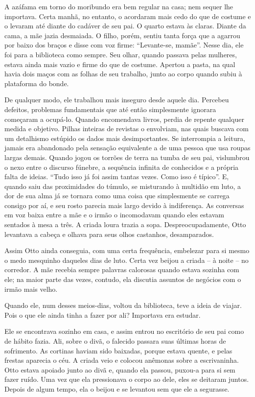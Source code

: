 A azáfama em torno do moribundo era bem regular na casa; nem sequer
lhe importava. Certa manhã, no entanto, o acordaram mais cedo do que de
costume e o levaram até diante do cadáver de seu pai. O quarto estava às
claras. Diante da cama, a mãe jazia desmaiada. O filho, porém, sentiu
tanta força que a agarrou por baixo dos braços e disse com voz firme:
``Levante-se, mamãe''. Nesse dia, ele foi para a biblioteca como sempre.
Seu olhar, quando passava pelas mulheres, estava ainda mais vazio e
firme do que de costume. Apertou a pasta, na qual havia dois maços com
as folhas de seu trabalho, junto ao corpo quando subiu à plataforma do
bonde.

De qualquer modo, ele trabalhou mais inseguro desde aquele dia. Percebeu
defeitos, problemas fundamentais que até então simplesmente ignorara
começaram a ocupá-lo. Quando encomendava livros, perdia de repente
qualquer medida e objetivo. Pilhas inteiras de revistas o envolviam, nas
quais buscava com um detalhismo estúpido os dados mais desimportantes.
Se interrompia a leitura, jamais era abandonado pela sensação
equivalente a de uma pessoa que usa roupas largas demais. Quando jogou
os torrões de terra na tumba de seu pai, vislumbrou o nexo entre o
discurso fúnebre, a sequência infinita de conhecidos e a própria falta
de ideias. ``Tudo isso já foi assim tantas vezes. Como isso é típico''.
E, quando saiu das proximidades do túmulo, se misturando à multidão em
luto, a dor de sua alma já se tornara como uma coisa que simplesmente se
carrega consigo por aí, e seu rosto parecia mais largo devido à
indiferença. As conversas em voz baixa entre a mãe e o irmão o
incomodavam quando eles estavam sentados à mesa a três. A criada loura
trazia a sopa. Despreocupadamente, Otto levantava a cabeça e olhava para
seus olhos castanhos, desamparados.

Assim Otto ainda conseguia, com uma certa frequência, embelezar para si
mesmo o medo mesquinho daqueles dias de luto. Certa vez beijou a criada
-- à noite -- no corredor. A mãe recebia sempre palavras calorosas
quando estava sozinha com ele; na maior parte das vezes, contudo, ela
discutia assuntos de negócios com o irmão mais velho.

Quando ele, num desses meios-dias, voltou da biblioteca, teve a ideia de
viajar. Pois o que ele ainda tinha a fazer por ali? Importava era
estudar.

Ele se encontrava sozinho em casa, e assim entrou no escritório de seu
pai como de hábito fazia. Ali, sobre o divã, o falecido passara suas
últimas horas de sofrimento. As cortinas haviam sido baixadas, porque
estava quente, e pelas frestas aparecia o céu. A criada veio e colocou
anêmonas sobre a escrivaninha. Otto estava apoiado junto ao divã e,
quando ela passou, puxou-a para si sem fazer ruído. Uma vez que ela
pressionava o corpo ao dele, eles se deitaram juntos. Depois de algum
tempo, ela o beijou e se levantou sem que ele a segurasse.

